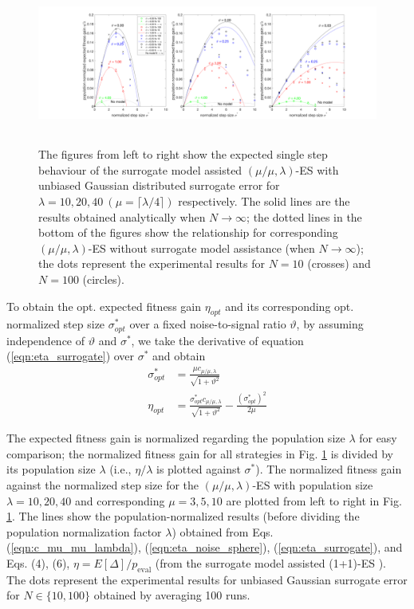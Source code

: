 \begin{center}
\begin{figure}
\includegraphics[height=2.1in, width=6.0in]{expectedFitGain_final_2}
\caption{The figures from left to right show the expected single step behaviour of the surrogate model assisted $(\mu/\mu,\lambda)$-ES with unbiased Gaussian distributed surrogate error for $\lambda=10,20,40\ (\mu = \lceil \lambda/4 \rceil)$ respectively. The solid lines are the results obtained analytically when $N \rightarrow \infty$; the dotted lines in the bottom of the figures show the relationship for corresponding $(\mu/\mu,\lambda)$-ES without surrogate model assistance (when $N\rightarrow \infty$); the dots represent the experimental results for $N=10$ (crosses) and $N=100$ (circles). 
}
\label{fig:expectedFitGain}
\end{figure}
\end{center}

To obtain the opt. expected fitness gain $\eta_{opt}$ and its corresponding opt. normalized step size $\sigma^*_{opt}$ over a fixed noise-to-signal ratio $\vartheta$, by assuming independence of $\vartheta$ and $\sigma^*$, we take the derivative of equation (\ref{eqn:eta_surrogate}) over $\sigma^*$ and obtain
\begin{align}\label{eqn:opt_surrogate}
\sigma^*_{opt} &= \frac{ \mu c_{\mu / \mu, \lambda}}{\sqrt {1+ \vartheta^2}}\\
\eta_{opt} &= \frac{\sigma^*_{opt} c_{\mu / \mu, \lambda}}{\sqrt {1+ \vartheta^2}} - \frac{(\sigma^*_{opt})^2}{2 \mu} 
\end{align}

The expected fitness gain is normalized regarding the population size $\lambda$ for easy comparison; the normalized fitness gain for all strategies in Fig. \ref{fig:expectedFitGain} is divided by its population size $\lambda$ (i.e., $\eta/\lambda$ is plotted against $\sigma^*$). The normalized fitness gain against the normalized step size for the $(\mu/\mu,\lambda)$-ES with population size $\lambda=10,20,40$ and corresponding $\mu=3,5,10$ are plotted from left to right in Fig. \ref{fig:expectedFitGain}. The lines show the population-normalized results (before dividing the population normalization factor $\lambda$) obtained from Eqs. (\ref{eqn:c_mu_mu_lambda}), (\ref{eqn:eta_noise_sphere}), (\ref{eqn:eta_surrogate}), and Eqs. (4), (6), $\eta = E[\Delta]/p_{\text{eval}}$ (from the surrogate model assisted (1+1)-ES \cite{DBLP:conf/ppsn/KayhaniA18}). The dots represent the experimental results for unbiased Gaussian surrogate error for $N \in \{10,100 \}$ obtained by averaging 100 runs. 

